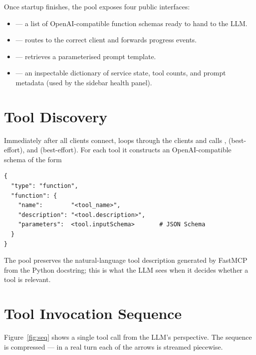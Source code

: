 Once startup finishes, the pool exposes four public interfaces:

\begin{itemize}[leftmargin=1.4em]
  \item {} --- a list of OpenAI-compatible function
        schemas ready to hand to the LLM.
  \item {} ---
        routes to the correct client and forwards progress events.
  \item {} --- retrieves a
        parameterised prompt template.
  \item {} --- an inspectable dictionary of service
        state, tool counts, and prompt metadata (used by the sidebar
        health panel).
\end{itemize}

\section{Tool Discovery}
\label{sec:discovery}

Immediately after all clients connect, 
loops through the clients and calls ,
 (best-effort), and 
(best-effort). For each tool it constructs an OpenAI-compatible
schema of the form
\begin{lstlisting}[caption={Schema shape passed to the Groq API.},
                    label={lst:openai-schema}]
{
  "type": "function",
  "function": {
    "name":        "<tool_name>",
    "description": "<tool.description>",
    "parameters":  <tool.inputSchema>       # JSON Schema
  }
}
\end{lstlisting}
The pool preserves the natural-language tool description generated by
FastMCP from the Python docstring; this is what the LLM sees when it
decides whether a tool is relevant.

\section{Tool Invocation Sequence}
\label{sec:invocation}

Figure~\ref{fig:seq} shows a single tool call from the LLM's
perspective. The sequence is compressed --- in a real turn each of
the arrows is streamed piecewise.

